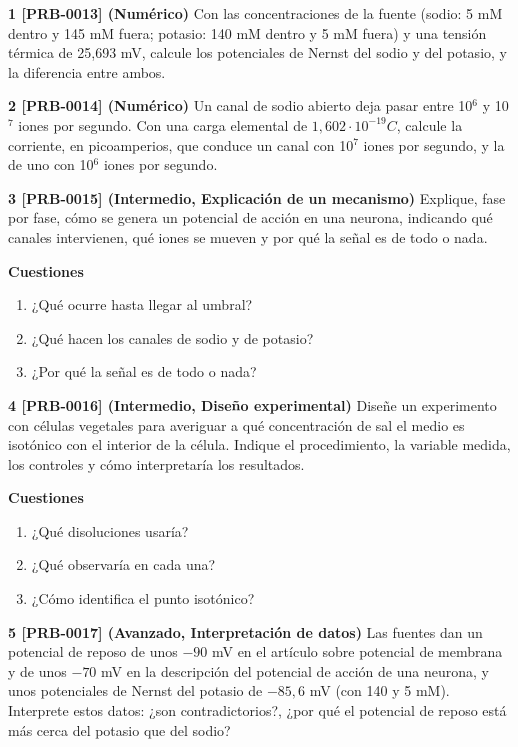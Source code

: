 \documentclass{book}
\begin{document}
\begin{tcolorbox}[title={Ejercicios}, studiumworked, breakable]

\noindent\textbf{1 [PRB-0013] (Numérico)}
Con las concentraciones de la fuente (sodio: 5 mM dentro y 145 mM fuera; potasio: 140 mM dentro y 5 mM fuera) y una tensión térmica de 25,693 mV, calcule los potenciales de Nernst del sodio y del potasio, y la diferencia entre ambos.


\noindent\textbf{2 [PRB-0014] (Numérico)}
Un canal de sodio abierto deja pasar entre 10\({}^{6}\) y 10\({}^{7}\) iones por segundo. Con una carga elemental de \(1,602\cdot10^{-19} C\), calcule la corriente, en picoamperios, que conduce un canal con 10\({}^{7}\) iones por segundo, y la de uno con 10\({}^{6}\) iones por segundo.


\noindent\textbf{3 [PRB-0015] (Intermedio, Explicación de un mecanismo)}
Explique, fase por fase, cómo se genera un potencial de acción en una neurona, indicando qué canales intervienen, qué iones se mueven y por qué la señal es de todo o nada.


\noindent\textbf{Cuestiones}
\begin{enumerate}
\item ¿Qué ocurre hasta llegar al umbral?
\item ¿Qué hacen los canales de sodio y de potasio?
\item ¿Por qué la señal es de todo o nada?
\end{enumerate}

\noindent\textbf{4 [PRB-0016] (Intermedio, Diseño experimental)}
Diseñe un experimento con células vegetales para averiguar a qué concentración de sal el medio es isotónico con el interior de la célula. Indique el procedimiento, la variable medida, los controles y cómo interpretaría los resultados.


\noindent\textbf{Cuestiones}
\begin{enumerate}
\item ¿Qué disoluciones usaría?
\item ¿Qué observaría en cada una?
\item ¿Cómo identifica el punto isotónico?
\end{enumerate}

\noindent\textbf{5 [PRB-0017] (Avanzado, Interpretación de datos)}
Las fuentes dan un potencial de reposo de unos \(-90\) mV en el artículo sobre potencial de membrana y de unos \(-70\) mV en la descripción del potencial de acción de una neurona, y unos potenciales de Nernst del potasio de \(-85,6\) mV (con 140 y 5 mM). Interprete estos datos: ¿son contradictorios?, ¿por qué el potencial de reposo está más cerca del potasio que del sodio?



\end{tcolorbox}
\end{document}
